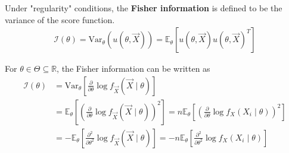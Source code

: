 \documentclass[11pt]{elegantbook}
\begin{document}
\begin{definition}
    \normalfont
    Under "regularity" conditions, the \textbf{Fisher information} is defined to be the variance of the score function.
    \begin{equation}
        \begin{aligned}
            \mathcal{I}(\theta)=\text{Var}_\theta(u(\theta,\vec{X}))=\mathbb{E}_\theta[u(\theta,\vec{X})u(\theta,\vec{X})^T]
        \end{aligned}
        \nonumber
    \end{equation}
\end{definition}
\begin{lemma}
    For $\theta\in\Theta\subseteq \mathbb{R}$, the Fisher information can be written as
    \begin{equation}
        \begin{aligned}
            \mathcal{I}(\theta)&=\text{Var}_\theta\left[\frac{\partial}{\partial \theta}\log f_{\vec{X}}(\vec{X}\mid\theta)\right]\\
            &=\mathbb{E}_\theta\left[\left(\frac{\partial}{\partial \theta}\log f_{\vec{X}}(\vec{X}\mid\theta)\right)^2\right]=n\mathbb{E}_\theta\left[\left(\frac{\partial}{\partial \theta}\log f_X(X_i\mid\theta)\right)^2\right]\\
            &=-\mathbb{E}_\theta\left[\frac{\partial^2}{\partial \theta^2}\log f_{\vec{X}}(\vec{X}\mid\theta)\right]=-n\mathbb{E}_\theta\left[\frac{\partial^2}{\partial \theta^2}\log f_X(X_i\mid\theta)\right]
        \end{aligned}
        \nonumber
    \end{equation}
\end{lemma}
\end{document}
